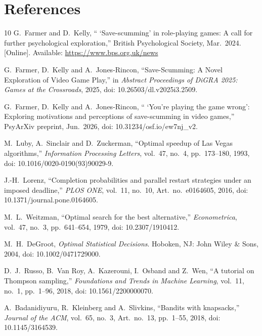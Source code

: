 \documentclass[11pt,a4paper]{article}
\newcommand{\who}[1]{}
\begin{document}
\section{References\who{Vivian}}
\label{sec:refs}
{\small
\setlength{\itemsep}{0.28em}
\begin{thebibliography}{10}
G.~Farmer and D.~Kelly, `` `Save-scumming' in role-playing games: A call for further psychological exploration,'' British Psychological Society, Mar.\ 2024. [Online]. Available: \url{https://www.bps.org.uk/news}

G.~Farmer, D.~Kelly and A.~Jones-Rincon, ``Save-Scumming: A Novel Exploration of Video Game Play,'' in \emph{Abstract Proceedings of DiGRA 2025: Games at the Crossroads}, 2025, doi: 10.26503/dl.v2025i3.2509.

G.~Farmer, D.~Kelly and A.~Jones-Rincon, `` `You're playing the game wrong': Exploring motivations and perceptions of save-scumming in video games,'' PsyArXiv preprint, Jun.\ 2026, doi: 10.31234/osf.io/ew7nj\_v2.

M.~Luby, A.~Sinclair and D.~Zuckerman, ``Optimal speedup of Las Vegas algorithms,'' \emph{Information Processing Letters}, vol.~47, no.~4, pp.~173--180, 1993, doi: 10.1016/0020-0190(93)90029-9.

J.-H.~Lorenz, ``Completion probabilities and parallel restart strategies under an imposed deadline,'' \emph{PLOS ONE}, vol.~11, no.~10, Art.\ no.~e0164605, 2016, doi: 10.1371/journal.pone.0164605.

M.~L.~Weitzman, ``Optimal search for the best alternative,'' \emph{Econometrica}, vol.~47, no.~3, pp.~641--654, 1979, doi: 10.2307/1910412.

M.~H.~DeGroot, \emph{Optimal Statistical Decisions}. Hoboken, NJ: John Wiley \& Sons, 2004, doi: 10.1002/0471729000.

D.~J.~Russo, B.~Van Roy, A.~Kazerouni, I.~Osband and Z.~Wen, ``A tutorial on Thompson sampling,'' \emph{Foundations and Trends in Machine Learning}, vol.~11, no.~1, pp.~1--96, 2018, doi: 10.1561/2200000070.

A.~Badanidiyuru, R.~Kleinberg and A.~Slivkins, ``Bandits with knapsacks,'' \emph{Journal of the ACM}, vol.~65, no.~3, Art.\ no.~13, pp.~1--55, 2018, doi: 10.1145/3164539.


\end{thebibliography}}
\end{document}
